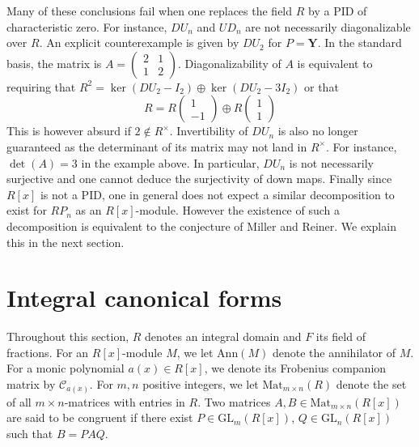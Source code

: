 \documentclass[ALCO, Unicode]{cedram}
\newcommand{\GL}{\mathrm{GL}}
\begin{document}
Many of  these conclusions fail when one replaces the field %
$ R $ by  a PID of characteristic zero. For instance, $  DU_{n} $ and $ UD_{n} $ are not necessarily diagonalizable over $ R $.  An explicit  counterexample is given by $ DU_{2} $ for $ P         =    \mathbf{Y}   $. In the standard basis, the matrix  is $ A = \left ( \begin{smallmatrix} 2  & 1  \\ 1  &  2          \end{smallmatrix}   \right ) $.   Diagonalizability of $ A $ is equivalent to requiring  that $ R^{2} =  \ker (DU_{2} - I_{2}) \oplus \ker ( DU_{2} - 3I_{2}) $ or that  
$$    R  =   R \left ( \begin{smallmatrix}    1 \\  - 1 \end{smallmatrix} \right ) \oplus  R \left ( \begin{smallmatrix} 1 \\  1  \end{smallmatrix} \right  )  $$
This is however absurd if $ 2 \notin R^{\times }$.  Invertibility of $ DU_{n} $ is also no longer guaranteed as the determinant of its matrix may not land in $ R^{\times} $.  For instance,  $ \det(A) = 3 $ in the example above. In particular, $ DU_{n} $ is not necessarily surjective and one cannot deduce the surjectivity of down maps.   Finally since $ R[x] $ is not a PID, one in general does not expect a similar decomposition to exist for $  R P_{n} $ %
as an $ R[x]$-module.  However the existence of such a decomposition is equivalent to the conjecture of Miller and Reiner. We explain this in the next section.                                                   


\section{Integral canonical forms}

Throughout this section,  $ R $ denotes an integral domain and $ F $ its field of fractions. For an $ R[x] $-module $ M $, we let  $ \mathrm{Ann}(M) $ denote  the annihilator of $ M $. For a monic polynomial $ a(x) \in R[x] $, we denote its Frobenius companion matrix by $  \mathcal{C}_{a(x)}  $. For $ m , n $ positive integers, we let $ \mathrm{Mat}_{m \times n }(R) $   denote the set of all $ m \times n $-matrices with entries in $ R $. Two matrices $ A , B \in \mathrm{Mat}_{m \times n }(R[x]) $ are said to be congruent if there exist $ P \in \GL_{m}(R[x]) $, $ Q \in \GL_{n}(R[x]) $ such that $ B =  P A Q $. 
\end{document}
